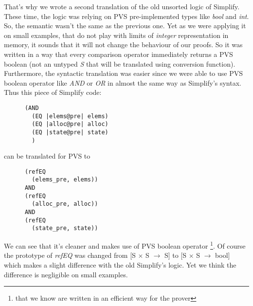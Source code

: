 \documentclass[english,a4paper,10pt]{article}
\begin{document}
That's why we wrote a second translation of the old unsorted logic of
Simplify. These time, the logic was relying on PVS pre-implemented
types like \textit{bool} and \textit{int}. So, the semantic wasn't the
same as the previous one. Yet as we were applying it on small
examples, that do not play with limits of \textit{integer}
representation in memory, it sounds that it will not change the
behaviour of our proofs. So it was written in a way that every
comparison operator immediately returns a PVS boolean (not an untyped
\textit{S} that will be translated using conversion
function). Furthermore, the syntactic translation was easier since we
were able to use PVS boolean operator like \textit{AND} or \textit{OR}
in almost the same way as Simplify's syntax. Thus this piece of
Simplify code:
\begin{verbatim}
      (AND 
        (EQ |elems@pre| elems)
        (EQ |alloc@pre| alloc)
        (EQ |state@pre| state)
        )
\end{verbatim}
can be translated for PVS to
\begin{verbatim}
      (refEQ
        (elems_pre, elems))
      AND
      (refEQ
        (alloc_pre, alloc))
      AND
      (refEQ
        (state_pre, state))
\end{verbatim} 
We can see that it's cleaner and makes use of PVS boolean operator
\footnote{that we know are written in an efficient way for the
  prover}. Of course the prototype of \textit{refEQ} was changed from
[S $\times$ S $\rightarrow$ S] to [S $\times$ S $\rightarrow$ bool]
which makes a slight difference with the old Simplify's logic. Yet we
think the difference is negligible on small examples.\\
\end{document}
